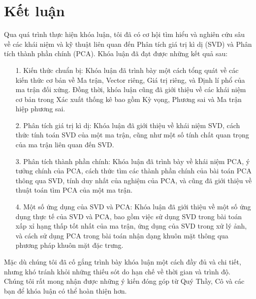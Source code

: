 \documentclass[12pt,a4paper,oneside]{report}
\numberwithin{equation}{section}
\begin{document}
\chapter*{Kết luận}
Qua quá trình thực hiện khóa luận, tôi đã có cơ hội tìm hiểu và nghiên cứu sâu về các khái niệm và kỹ thuật liên quan đến Phân tích giá trị kì dị (SVD) và Phân tích thành phần chính (PCA). Khóa luận đã đạt được những kết quả sau:
\begin{itemize}
	\item[1.] Kiến thức chuẩn bị: Khóa luận đã trình bày một cách tổng quát về các kiến thức cơ bản về Ma trận, Vector riêng, Giá trị riêng, và Định lí phổ của ma trận đối xứng. Đồng thời, khóa luận cũng đã giới thiệu về các khái niệm cơ bản trong Xác xuất thống kê bao gồm Kỳ vọng, Phương sai và Ma trận hiệp phương sai.

\item[2.] Phân tích giá trị kì dị: Khóa luận đã giới thiệu về khái niệm SVD, cách thức tính toán SVD của một ma trận, cũng như một số tính chất quan trọng của ma trận liên quan đến SVD.

\item[3.] Phân tích thành phần chính: Khóa luận đã trình bày về khái niệm PCA, ý tưởng chính của PCA, cách thức tìm các thành phần chính của bài toán PCA thông qua SVD, tính duy nhất của nghiệm của PCA, và cũng đã giới thiệu về thuật toán tìm PCA của một ma trận.

\item[4.] Một số ứng dụng của SVD và PCA: Khóa luận đã giới thiệu về một số ứng dụng thực tế của SVD và PCA, bao gồm việc sử dụng SVD trong bài toán xấp xỉ hạng thấp tốt nhất của ma trận, ứng dụng của SVD trong xử lý ảnh, và cách sử dụng PCA trong bài toán nhận dạng khuôn mặt thông qua phương pháp khuôn mặt đặc trưng.
\end{itemize}
Mặc dù chúng tôi đã cố gắng trình bày khóa luận một cách đầy đủ và chi tiết, nhưng khó tránh khỏi những thiếu sót do hạn chế về thời gian và trình độ. Chúng tôi rất mong nhận được những ý kiến đóng góp từ Quý Thầy, Cô và các bạn để khóa luận có thể hoàn thiện hơn.

\printbibheading[title={Tài liệu tham khảo}]
\printbibliography[keyword={vietnamese}, heading=subbibliography, title={Tiếng Việt}]
\printbibliography[keyword={english}, heading=subbibliography, title={Tiếng Anh}]
\end{document}
